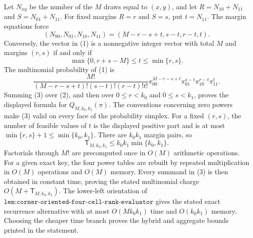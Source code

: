Let \(N_{xy}\) be the number of the \(M\) draws equal to \((x,y)\), and let \(R=N_{10}+N_{11}\) and \(S=N_{01}+N_{11}\). For fixed margins \(R=r\) and \(S=s\), put \(t=N_{11}\). The margin equations force
\[
(N_{00},N_{01},N_{10},N_{11})=(M-r-s+t,s-t,r-t,t).
\tag{1}
\]
Conversely, the vector in (1) is a nonnegative integer vector with total \(M\) and margins \((r,s)\) if and only if
\[
\max\{0,r+s-M\}\le t\le\min\{r,s\}.
\tag{2}
\]
The multinomial probability of (1) is
\[
\frac{M!}{(M-r-s+t)!(s-t)!(r-t)!t!}\pi_{00}^{M-r-s+t}\pi_{01}^{s-t}\pi_{10}^{r-t}\pi_{11}^{t}.
\tag{3}
\]
Summing (3) over (2), and then over \(0\le r<k_0\) and \(0\le s<k_1\), proves the displayed formula for \(Q_{M,k_0,k_1}(\pi)\). The conventions concerning zero powers make (3) valid on every face of the probability simplex. For a fixed \((r,s)\), the number of feasible values of \(t\) is the displayed positive part and is at most \(\min\{r,s\}+1\le\min\{k_0,k_1\}\). There are \(k_0k_1\) margin pairs, so
\[
\mathsf T_{M,k_0,k_1}\le k_0k_1\min\{k_0,k_1\}.
\tag{4}
\]
Factorials through \(M!\) are precomputed once in \(O(M)\) arithmetic operations. For a given exact key, the four power tables are rebuilt by repeated multiplication in \(O(M)\) operations and \(O(M)\) memory. Every summand in (3) is then obtained in constant time, proving the stated multinomial charge \(O(M+\mathsf T_{M,k_0,k_1})\). The lower-left orientation of \(\texttt{lem:corner-oriented-four-cell-rank-evaluator}\) gives the stated exact recurrence alternative with at most \(O(Mk_0k_1)\) time and \(O(k_0k_1)\) memory. Choosing the cheaper time branch proves the hybrid and aggregate bounds printed in the statement.

